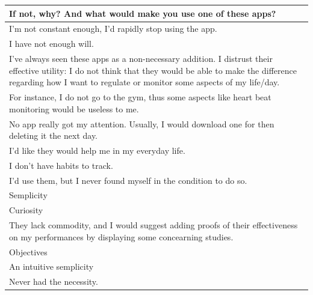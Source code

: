 \documentclass{article}
\begin{document}
\begin{table}[H]
    \centering
    \begin{tabularx}{0.9\textwidth}{X}
        \hline
        \textbf{If not, why? And what would make you use one of these apps?} \\
        \hline
        I'm not constant enough, I'd rapidly stop using the app. \\
        \hline
        I have not enough will. \\
        \hline
        I've always seen these apps as a non-necessary addition. I distrust their effective utility: I do not think that they would be able to make the difference regarding how I want to regulate or monitor some aspects of my life/day. \\
        \hline
        For instance, I do not go to the gym, thus some aspects like heart beat monitoring would be useless to me. \\
        \hline
        No app really got my attention. Usually, I would download one for then deleting it the next day. \\
        \hline
        I'd like they would help me in my everyday life. \\
        \hline
        I don't have habits to track. \\
        \hline
        I'd use them, but I never found myself in the condition to do so. \\
        \hline
        Semplicity \\
        \hline
        Curiosity \\
        \hline
        They lack commodity, and I would suggest adding proofs of their effectiveness on my performances by displaying some concearning studies. \\
        \hline
        Objectives \\
        \hline
        An intuitive semplicity \\
        \hline
        Never had the necessity. \\
        \hline
    \end{tabularx}
\end{table}
\end{document}
